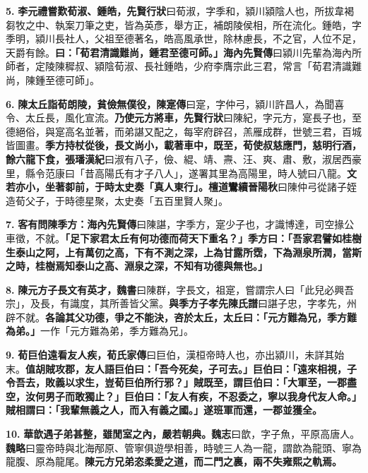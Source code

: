 \textbf{5.} \textbf{李元禮嘗歎荀淑、鍾皓，}{\footnotesize \textbf{先賢行狀}曰荀淑，字季和，潁川潁陰人也，所拔韋褐芻牧之中、執案刀筆之吏，皆為英彥，舉方正，補朗陵侯相，所在流化。鍾皓，字季明，潁川長社人，父祖至德著名，皓高風承世，除林慮長，不之官，人位不足，天爵有餘。}\textbf{曰：「荀君清識難尚，鍾君至德可師。」}{\footnotesize \textbf{海內先賢傳}曰潁川先輩為海內所師者，定陵陳穉叔、潁陰荀淑、長社鍾皓，少府李膺宗此三君，常言「荀君清識難尚，陳鍾至德可師」。}

\textbf{6.} \textbf{陳太丘詣荀朗陵，貧儉無僕役，}{\footnotesize \textbf{陳寔傳}曰寔，字仲弓，潁川許昌人，為聞喜令、太丘長，風化宣流。}\textbf{乃使元方將車，}{\footnotesize \textbf{先賢行狀}曰陳紀，字元方，寔長子也，至德絕俗，與寔高名並著，而弟諶又配之，每宰府辟召，羔雁成群，世號三君，百城皆圖畫。}\textbf{季方持杖從後，長文尚小，載著車中，既至，荀使叔慈應門，慈明行酒，餘六龍下食，}{\footnotesize \textbf{張璠漢紀}曰淑有八子，儉、緄、靖、燾、汪、爽、肅、敷，淑居西豪里，縣令范康曰「昔高陽氏有才子八人」，遂署其里為高陽里，時人號曰八龍。}\textbf{文若亦小，坐著厀前，于時太史奏「真人東行」。}{\footnotesize \textbf{檀道鸞續晉陽秋}曰陳仲弓從諸子姪造荀父子，于時德星聚，太史奏「五百里賢人聚」。}

\textbf{7.} \textbf{客有問陳季方：}{\footnotesize \textbf{海內先賢傳}曰陳諶，字季方，寔少子也，才識博達，司空掾公車徵，不就。}\textbf{「足下家君太丘有何功德而荷天下重名？」季方曰：「吾家君譬如桂樹生泰山之阿，上有萬仞之高，下有不測之深，上為甘露所霑，下為淵泉所潤，當斯之時，桂樹焉知泰山之高、淵泉之深，不知有功德與無也。」}

\textbf{8.} \textbf{陳元方子長文有英才，}{\footnotesize \textbf{魏書}曰陳群，字長文，祖寔，嘗謂宗人曰「此兒必興吾宗」，及長，有識度，其所善皆父黨。}\textbf{與季方子孝先}{\footnotesize \textbf{陳氏譜}曰諶子忠，字孝先，州辟不就。}\textbf{各論其父功德，爭之不能決，咨於太丘，太丘曰：「元方難為兄，季方難為弟。」}{\footnotesize 一作「元方難為弟，季方難為兄」。}

\textbf{9.} \textbf{荀巨伯遠看友人疾，}{\footnotesize \textbf{荀氏家傳}曰巨伯，漢桓帝時人也，亦出潁川，未詳其始末。}\textbf{值胡賊攻郡，友人語巨伯曰：「吾今死矣，子可去。」巨伯曰：「遠來相視，子令吾去，敗義以求生，豈荀巨伯所行邪？」賊既至，謂巨伯曰：「大軍至，一郡盡空，汝何男子而敢獨止？」巨伯曰：「友人有疾，不忍委之，寧以我身代友人命。」賊相謂曰：「我輩無義之人，而入有義之國。」遂班軍而還，一郡並獲全。}

\textbf{10.} \textbf{華歆遇子弟甚整，雖閒室之內，嚴若朝典。}{\footnotesize \textbf{魏志}曰歆，字子魚，平原高唐人。\textbf{魏略}曰靈帝時與北海邴原、管寧俱遊學相善，時號三人為一龍，謂歆為龍頭、寧為龍腹、原為龍尾。}\textbf{陳元方兄弟恣柔愛之道，而二門之裏，兩不失雍熙之軌焉。}

